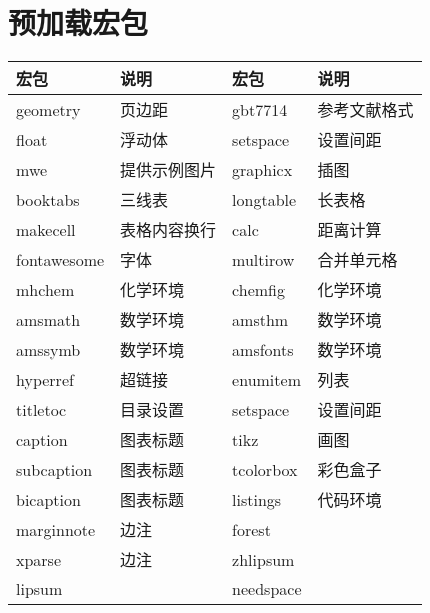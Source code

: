 \section{预加载宏包}
\begin{table}[hp]
	\renewcommand\arraystretch{1.2}
	\centering  %
	\label{tab:1}
	\begin{tabular}{ll||ll} %
		\hline
		宏包 		&说明		    & 宏包 	   & 说明     \\
		\hline 
		geometry  &页边距	     &gbt7714	  &参考文献格式 \\
		float	  &浮动体	     &setspace	  & 设置间距  \\
		mwe 	  &提供示例图片  & graphicx  & 插图       \\
		booktabs  &三线表       & longtable &长表格      \\
		makecell   &表格内容换行 & calc      & 距离计算   \\
		fontawesome& 字体       & multirow  & 合并单元格  \\
		mhchem     &化学环境     &chemfig   &化学环境     \\
		amsmath    &数学环境    &amsthm     &数学环境     \\
		amssymb    &数学环境    &amsfonts   &数学环境     \\
		hyperref   & 超链接    &enumitem    &列表         \\
		titletoc   & 目录设置  &setspace     &设置间距    \\
		caption    & 图表标题  &tikz        &画图         \\
		subcaption & 图表标题  &tcolorbox   & 彩色盒子   \\
		bicaption &  图表标题  &listings    & 代码环境    \\
		marginnote&  边注      &forest      &             \\
		xparse    &  边注      &zhlipsum    &             \\
        lipsum    &            &needspace  &              \\
		\hline
	\end{tabular}
\end{table}

